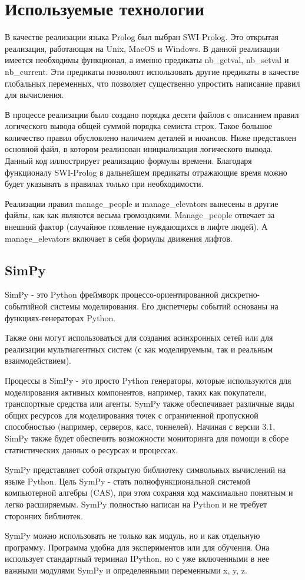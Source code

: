 	\section{Используемые технологии}

	В качестве реализации языка Prolog был выбран SWI-Prolog.
		Это открытая реализация, работающая на Unix, MacOS и Windows.
		В данной реализации имеется необходимы функционал, а именно предикаты nb\_getval, nb\_setval и nb\_current.
		Эти предикаты позволяют использовать другие предикаты в качестве глобальных переменных, что
		позволяет существенно упростить написание правил для вычисления.

	В процессе реализации было создано порядка десяти файлов с описанием правил логического вывода
		общей суммой порядка семиста строк. Такое большое количество правил обусловлено наличием деталей и нюансов.
		Ниже представлен основной файл, в котором реализован инициализация логического вывода.
		Данный код иллюстрирует реализацию формулы времени. Благодаря функционалу SWI-Prolog
		в дальнейшем предикаты отражающие время можно будет указывать в правилах только при необходимости.

	Реализации правил manage\_people и manage\_elevators вынесены в другие файлы,
		как как являются весьма громоздкими.
		Manage\_people отвечает за внешний фактор (случайное появление нуждающихся в лифте людей).
		А manage\_elevators включает в себя формулы движения лифтов.
\subsection{SimPy}

SimPy - это Python фреймворк процессо-ориентированной дискретно-событийной системы моделирования. Его диспетчеры событий основаны на функциях-генераторах Python.

Также они могут использоваться для создания асинхронных сетей или для реализации мультиагентных систем (с как моделируемым, так и реальным взаимодействием).

Процессы в SimPy - это просто Python генераторы, которые используются для моделирования активных компонентов, например, таких как покупатели, транспортные средства или агенты. SymPy также обеспечивает различные виды общих ресурсов для моделирования точек с ограниченной пропускной способностью (например, серверов, касс, тоннелей). Начиная с версии 3.1, SimPy также будет обеспечить возможности мониторинга для помощи в сборе статистических данных о ресурсах и процессах. 

SymPy представляет собой открытую библиотеку символьных вычислений на языке Python. Цель SymPy - стать полнофункциональной системой компьютерной алгебры (CAS), при этом сохраняя код максимально понятным и легко расширяемым. SymPy полностью написан на Python и не требует сторонних библиотек.

SymPy можно использовать не только как модуль, но и как отдельную программу. Программа удобна для экспериментов или для обучения. Она использует стандартный терминал IPython, но с уже включенными в нее важными модулями SymPy и определенными переменными x, y, z.
